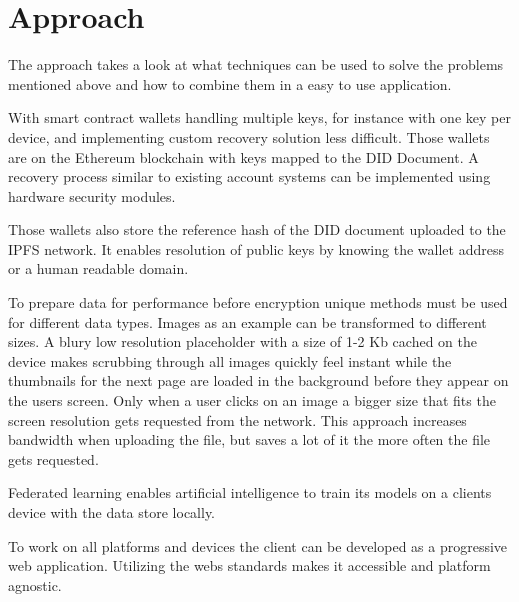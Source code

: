 \section{Approach}

The approach takes a look at what techniques can be used
to solve the problems mentioned above and how to combine
them in a easy to use application.

With smart contract wallets
\cite{smartContractWallet}
handling multiple keys,
for instance with one key per device, and implementing
custom recovery solution less difficult. Those wallets
are on the Ethereum blockchain with keys mapped to
the DID Document. A recovery process similar to existing
account systems can be implemented using hardware
security modules.
\cite{recovery}

Those wallets also store the reference hash of the DID
document uploaded to the IPFS network. It enables
resolution of public keys by knowing the wallet
address or a human readable domain.

To prepare data for performance before encryption unique
methods must be used for different data types. Images
as an example can be transformed to different sizes. A blury
low resolution placeholder with a size of 1-2 Kb cached
on the device makes scrubbing through all images quickly
feel instant while the thumbnails for the next page are
loaded in the background before they appear on the users
screen. Only when a user clicks on an image a bigger size
that fits the screen resolution gets requested from the
network.
\cite{images}
This approach increases bandwidth when uploading
the file, but saves a lot of it the more often the
file gets requested.

Federated learning enables artificial intelligence to train
its models on a clients device with the data store locally.
\cite{ai}

To work on all platforms and devices the client can be
developed as a progressive web application. Utilizing the
webs standards makes it accessible and platform agnostic.
\cite{pwa}